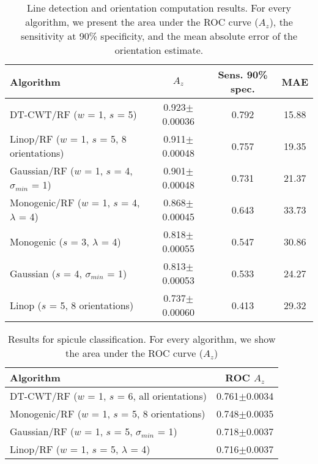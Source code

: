 \begin{table}
\centering
\caption{Line detection and orientation computation results. For every algorithm, we present the area under the ROC curve ($A_z$), the sensitivity at 90\% specificity, and the mean absolute error of the orientation estimate.}
\label{t:line_detection}
%
\begin{tabular}{l c c c}
Algorithm	
		& $A_z$							& Sens. \@ 90\% spec. & MAE \\
\hline
DT-CWT/RF ($w$ = 1, $s$ = 5)												
		& 0.923$\pm$0.00036	& 0.792 							& 15.88 \\
Linop/RF ($w$ = 1, $s$ = 5, 8 orientations)				
		& 0.911$\pm$0.00048	& 0.757								& 19.35 \\
Gaussian/RF ($w$ = 1, $s$ = 4, $\sigma_{min}$ = 1)
		& 0.901$\pm$0.00048	& 0.731								& 21.37 \\
Monogenic/RF ($w$ = 1, $s$ = 4, $\lambda$ = 4)
		& 0.868$\pm$0.00045	& 0.643								& 33.73 \\
Monogenic ($s$ = 3, $\lambda$ = 4)									
		& 0.818$\pm$0.00055	& 0.547								& 30.86 \\
Gaussian ($s$ = 4, $\sigma_{min}$ = 1)							
		& 0.813$\pm$0.00053	& 0.533								& 24.27 \\
Linop ($s$ = 5, 8 orientations)										
		& 0.737$\pm$0.00060	& 0.413								& 29.32 \\
\end{tabular}
\end{table}


\begin{table}
\caption{Results for spicule classification. For every algorithm, we show the area under the ROC curve ($A_z$)}
\label{t:spicule_classification}
%
\begin{tabular}{l c}
Algorithm
		& ROC $A_z$ \\
\hline
DT-CWT/RF ($w$ = 1, $s$ = 6, all orientations)
		& 0.761$\pm$0.0034 \\
Monogenic/RF ($w$ = 1, $s$ = 5, 8 orientations)
		& 0.748$\pm$0.0035 \\
Gaussian/RF ($w$ = 1, $s$ = 5, $\sigma_{min}$ = 1)
		& 0.718$\pm$0.0037 \\
Linop/RF ($w$ = 1, $s$ = 5, $\lambda$ = 4)
		& 0.716$\pm$0.0037 \\
\end{tabular}
\end{table}

